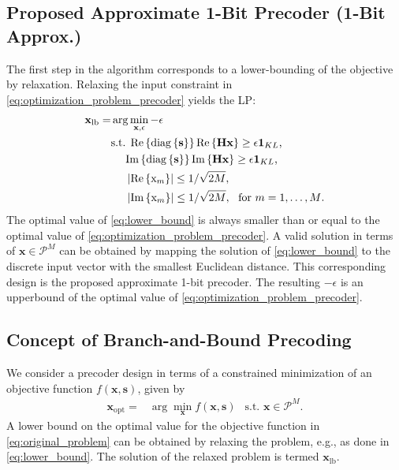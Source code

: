 \documentclass[journal,comsoc]{IEEEtran}
\begin{document}
\subsection{Proposed Approximate 1-Bit Precoder (1-Bit Approx.)}
\label{sec:lower-bounding}
The first step in the algorithm corresponds to a lower-bounding of the objective by relaxation.
Relaxing the input constraint in \eqref{eq:optimization_problem_precoder} yields the LP: 
\begin{align}
\label{eq:lower_bound}
\mathbf{x}_{\textrm{lb}}=&  \arg\min_{\mathbf{x}, \epsilon}  -\epsilon \\
& \textrm{s.t. }     \mathrm{Re} \left\{   \mathrm{diag} \left\{ \mathbf{s} \right\}  \right\}    \mathrm{Re} \left\{ \mathbf{H} \mathbf{x}  \right\}   \geq  \epsilon \boldsymbol{1}_{K L} \textrm{,} \notag \\
& \ \ \ \            \mathrm{Im} \left\{   \mathrm{diag} \left\{ \mathbf{s} \right\}  \right\}    \mathrm{Im} \left\{ \mathbf{H} \mathbf{x}  \right\}   \geq  \epsilon \boldsymbol{1}_{K L} \textrm{,} \notag \\
&\ \ \ \   \left| \mathrm{Re} \left\{{\mathrm{x}}_m \right\}\right| \leq  1/\sqrt{2M}  ,     \notag \\
& \ \ \ \   \left| \mathrm{Im} \left\{{\mathrm{x}}_m \right\}\right| \leq   1/\sqrt{2M} , \ \ \textrm{for } m=1,\ldots,M  \textrm{.}   \notag
\end{align}
The optimal value of \eqref{eq:lower_bound} is always smaller than or equal to the optimal value of \eqref{eq:optimization_problem_precoder}. A valid solution in terms of $\mathbf{x} \in \mathcal{P}^M$ can be obtained by mapping the solution of \eqref{eq:lower_bound} to the discrete input vector with the smallest Euclidean distance. This corresponding design is the proposed approximate 1-bit precoder. The resulting $-\epsilon$ is an upperbound of the optimal value of \eqref{eq:optimization_problem_precoder}.


\subsection{Concept of Branch-and-Bound Precoding}
We consider a precoder design in terms of a constrained minimization of an objective function $f(\mathbf{x}, \mathbf{s})$, given by
\begin{align}
\label{eq:original_problem}
\mathbf{x}_{\textrm{opt}} =& \arg\min_{\mathbf{x}} f(\mathbf{x}, \mathbf{s} ) \ \ \textrm{    s.t. } \mathbf{x} \in   \mathcal{P}^{M} \textrm{.}    
\end{align}
A lower bound on the optimal value for the objective function in \eqref{eq:original_problem} can be obtained by relaxing the problem, e.g., as done in \eqref{eq:lower_bound}.  
The solution of the relaxed problem is termed $\mathbf{x}_{\textrm{lb}}$.
 
\end{document}

